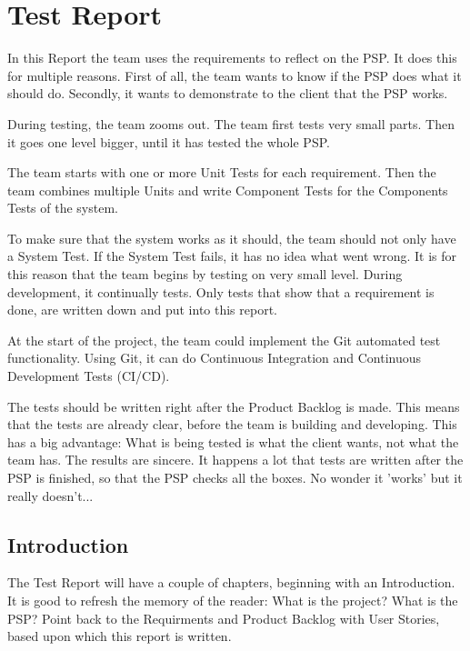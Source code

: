 \documentclass[10pt]{report}
\begin{document}
\medskip
\minitoc

\newpage

\section{Test Report}

In this Report the team uses the requirements to reflect on the PSP. It does this for multiple reasons. First of all, the team wants to know if the PSP does what it should do. Secondly, it wants to demonstrate to the client that the PSP works. 

During testing, the team zooms out. The team first tests very small parts. Then it goes one level bigger, until it has tested the whole PSP.

The team starts with one or more Unit Tests for each requirement. Then the team combines multiple Units and write Component Tests for the Components Tests of the system. 

\bigskip

To make sure that the system works as it should, the team should not only have a System Test. If the System Test fails, it has no idea what went wrong. It is for this reason that the team begins by testing on very small level. During development, it continually tests. Only tests that show that a requirement is done, are written down and put into this report.

At the start of the project, the team could implement the Git automated test functionality. Using Git, it can do Continuous Integration and Continuous Development Tests (CI/CD).

\bigskip

The tests should be written right after the Product Backlog is made. This means that the tests are already clear, before the team is building and developing. This has a big advantage: What is being tested is what the client wants, not what the team has. The results are sincere. It happens a lot that tests are written after the PSP is finished, so that the PSP checks all the boxes. No wonder it 'works' but it really doesn't...

\subsection{Introduction}

The Test Report will have a couple of chapters, beginning with an Introduction. It is good to refresh the memory of the reader: What is the project? What is the PSP? Point back to the Requirments and Product Backlog with User Stories, based upon which this report is written.
\end{document}
